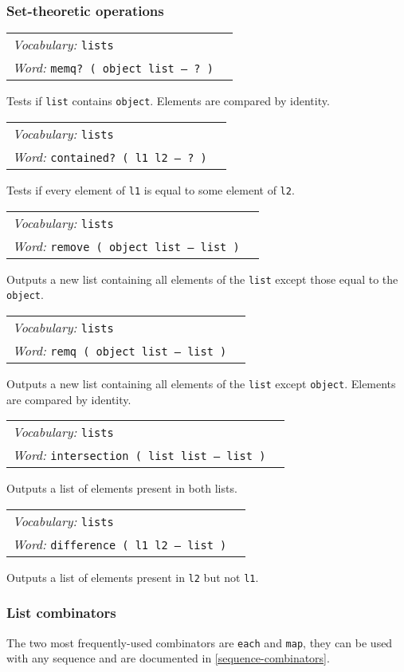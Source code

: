 \documentclass{book}
\newcommand{\vocabulary}[1]{\emph{Vocabulary:} \texttt{#1}&\\}
\newcommand{\ordinaryword}[2]{\index{\texttt{#1}}\emph{Word:} \texttt{#2}&\\}
\newcommand{\wordtable}[1]{


\begin{tabularx}{12cm}{lX}
\hline
#1
\hline
\end{tabularx}

}
\begin{document}
\subsubsection{Set-theoretic operations}

\wordtable{
\vocabulary{lists}
\ordinaryword{memq?}{memq?~( object list -- ?~)}
}
Tests if \texttt{list} contains \texttt{object}. Elements are compared by identity.
\wordtable{
\vocabulary{lists}
\ordinaryword{contained?}{contained?~( l1 l2 -- ?~)}
}
Tests if every element of \texttt{l1} is equal to some element of \texttt{l2}.
\wordtable{
\vocabulary{lists}
\ordinaryword{remove}{remove ( object list -- list )}
}
Outputs a new list containing all elements of the \texttt{list} except those equal to the \texttt{object}.
\wordtable{
\vocabulary{lists}
\ordinaryword{remq}{remq ( object list -- list )}
}
Outputs a new list containing all elements of the \texttt{list} except \texttt{object}. Elements are compared by identity.
\wordtable{
\vocabulary{lists}
\ordinaryword{intersection}{intersection ( list list -- list )}
}
Outputs a list of elements present in both lists.
\wordtable{
\vocabulary{lists}
\ordinaryword{intersection}{difference ( l1 l2 -- list )}
}
Outputs a list of elements present in \texttt{l2} but not \texttt{l1}.

\subsubsection{List combinators}

The two most frequently-used combinators are \verb|each| and \verb|map|, they can be used with any sequence and are documented in \ref{sequence-combinators}.
\end{document}
